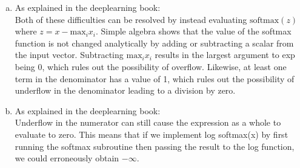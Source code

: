 \documentclass[12pt]{article}
\begin{document}
\begin{enumerate}[a)]
    \item 
        As explained in the deeplearning book:\\
        Both of these difficulties can be resolved by instead evaluating $\text{softmax}(z)$ where $z = x - \text{max}_i x_i$. Simple algebra shows that the value of the softmax function is not changed analytically by adding or subtracting a scalar from the input vector. Subtracting $\text{max}_i x_i$ results in the largest argument to exp being 0, which rules out the possibility of overflow. Likewise, at least one term in the denominator has a value of 1, which rules out the possibility of underflow in the denominator leading to a division by zero.
    \item
        As explained in the deeplearning book:\\
        Underflow in the numerator can still cause the expression as a whole to evaluate to zero. This means that if we implement log softmax(x) by first running the softmax subroutine then passing the result to the log function, we could erroneously obtain $-\infty$.
\end{enumerate}
\end{document}
